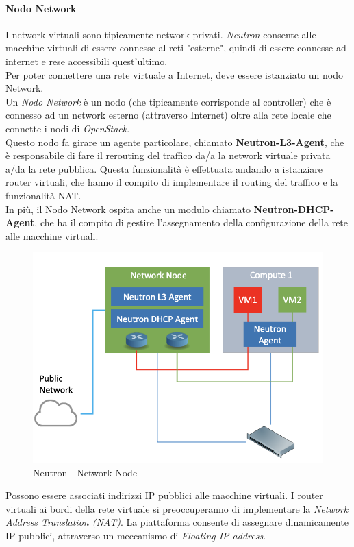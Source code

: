 \documentclass{article}
\begin{document}
\paragraph{Nodo Network} 
I network virtuali sono tipicamente network privati. \textit{Neutron} consente alle macchine virtuali di essere connesse al reti "esterne", quindi di essere connesse ad internet e rese accessibili quest'ultimo. \\ 
Per poter connettere una rete virtuale a Internet, deve essere istanziato un nodo Network. \\
Un \textit{Nodo Network} è un nodo (che tipicamente corrisponde al controller) che è connesso ad un network esterno (attraverso Internet) oltre alla rete locale che connette i nodi di \textit{OpenStack}. \\
Questo nodo fa girare un agente particolare, chiamato \textbf{Neutron-L3-Agent}, che è responsabile di fare il rerouting del traffico da/a la network virtuale privata a/da la rete pubblica. Questa funzionalità è effettuata andando a istanziare router virtuali, che hanno il compito di implementare il routing del traffico e la funzionalità NAT. \\ 
In più, il Nodo Network ospita anche un modulo chiamato \textbf{Neutron-DHCP-Agent}, che ha il compito di gestire l'assegnamento della configurazione della rete alle macchine virtuali.
\begin{figure}[H]
    \centering
    \includegraphics[scale=0.5]{img/neutron network node.png}
    \caption{Neutron - Network Node}
\end{figure}\noindent
Possono essere associati indirizzi IP pubblici alle macchine virtuali. I router virtuali ai bordi della rete virtuale si preoccuperanno di implementare la \textit{Network Address Translation (NAT)}. La piattaforma consente di assegnare dinamicamente IP pubblici, attraverso un meccanismo di \textit{Floating IP address}. %
\end{document}
